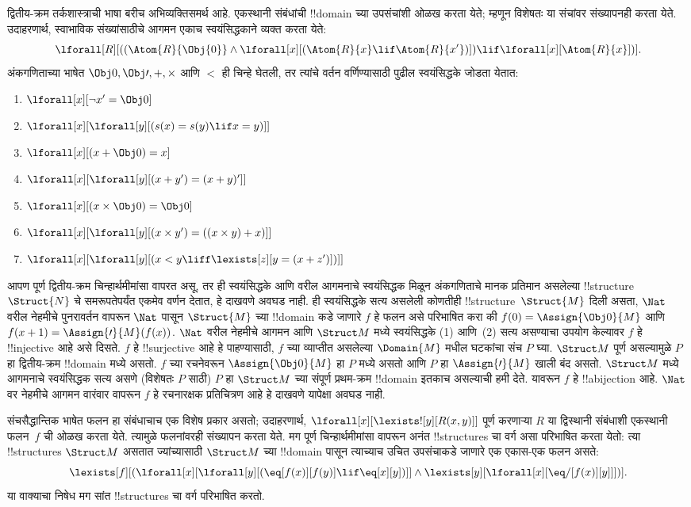 \documentclass[../../../include/open-logic-section]{subfiles}
\begin{document}
द्वितीय-क्रम तर्कशास्त्राची भाषा बरीच अभिव्यक्तिसमर्थ आहे. एकस्थानी संबंधांची
!!{domain} च्या उपसंचांशी ओळख करता येते; म्हणून विशेषतः या संचांवर संख्यापनही
करता येते. उदाहरणार्थ, स्वाभाविक संख्यांसाठीचे आगमन एकाच स्वयंसिद्धकाने
व्यक्त करता येते:
\[
\lforall[R][((\Atom{R}{\Obj{0}} \land \lforall[x][(\Atom{R}{x} \lif
    \Atom{R}{x'})]) \lif \lforall[x][\Atom{R}{x}])].
\]
अंकगणिताच्या भाषेत $\Obj 0, \Obj \prime, +, \times$ आणि $<$ ही चिन्हे घेतली,
तर त्यांचे वर्तन वर्णिण्यासाठी पुढील स्वयंसिद्धके जोडता येतात:
\begin{enumerate}
\item $\lforall[x][\lnot x' = \Obj 0]$
\item $\lforall[x][\lforall[y][(s(x) = s(y) \lif x = y)]]$
\item $\lforall[x][(x + \Obj 0) = x]$
\item $\lforall[x][\lforall[y][(x + y') = (x + y)']]$
\item $\lforall[x][(x \times \Obj 0) = \Obj 0]$
\item $\lforall[x][\lforall[y][(x \times y') = ((x \times y) + x)]]$
\item $\lforall[x][\lforall[y][(x < y \liff \lexists[z][y = (x + z')])]]$
\end{enumerate}
आपण पूर्ण द्वितीय-क्रम चिन्हार्थमीमांसा वापरत असू, तर ही स्वयंसिद्धके आणि
वरील आगमनाचे स्वयंसिद्धक मिळून अंकगणिताचे मानक प्रतिमान असलेल्या
!!{structure}~$\Struct{N}$ चे समरूपतेपर्यंत एकमेव वर्णन देतात, हे दाखवणे
अवघड नाही. ही स्वयंसिद्धके सत्य असलेली कोणतीही !!{structure}~$\Struct{M}$
दिली असता, $\Nat$ वरील नेहमीचे पुनरावर्तन वापरून $\Nat$ पासून
$\Struct{M}$ च्या !!{domain} कडे जाणारे $f$ हे फलन असे परिभाषित करा की
$f(0) = \Assign{\Obj 0}{M}$ आणि $f(x+1) = \Assign{\prime}{M}(f(x))$.
$\Nat$ वरील नेहमीचे आगमन आणि $\Struct M$ मध्ये स्वयंसिद्धके (1) आणि~(2)
सत्य असण्याचा उपयोग केल्यावर $f$ हे !!{injective} आहे असे दिसते. $f$ हे
!!{surjective} आहे हे पाहण्यासाठी, $f$ च्या व्याप्तीत असलेल्या
$\Domain{M}$ मधील घटकांचा संच $P$ घ्या. $\Struct M$ पूर्ण असल्यामुळे $P$
हा द्वितीय-क्रम !!{domain} मध्ये असतो. $f$ च्या रचनेवरून
$\Assign{\Obj 0}{M}$ हा $P$ मध्ये असतो आणि $P$ हा
$\Assign{\prime}{M}$ खाली बंद असतो. $\Struct M$ मध्ये आगमनाचे स्वयंसिद्धक
सत्य असणे (विशेषतः $P$ साठी) $P$ हा $\Struct M$ च्या संपूर्ण प्रथम-क्रम
!!{domain} इतकाच असल्याची हमी देते. यावरून $f$ हे !!a{bijection} आहे.
$\Nat$ वर नेहमीचे आगमन वारंवार वापरून $f$ हे रचनारक्षक प्रतिचित्रण आहे हे
दाखवणे यापेक्षा अवघड नाही.

संचसैद्धान्तिक भाषेत फलन हा संबंधाचाच एक विशेष प्रकार असतो; उदाहरणार्थ,
$\lforall[x][\lexists![y][R(x,y)]]$ पूर्ण करणाऱ्या $R$ या द्विस्थानी
संबंधाशी एकस्थानी फलन~$f$ ची ओळख करता येते. त्यामुळे फलनांवरही संख्यापन करता
येते. मग पूर्ण चिन्हार्थमीमांसा वापरून अनंत !!{structure}s चा वर्ग असा
परिभाषित करता येतो: त्या !!{structure}s $\Struct M$ असतात ज्यांच्यासाठी
$\Struct M$ च्या !!{domain} पासून त्याच्याच उचित उपसंचाकडे जाणारे एक
एकास-एक फलन असते:
\[
\lexists[f][(\lforall[x][\lforall[y][(\eq[f(x)][f(y)] \lif \eq[x][y])]]
  \land \lexists[y][\lforall[x][\eq/[f(x)][y]]])].
\]
या वाक्याचा निषेध मग सांत !!{structure}s चा वर्ग परिभाषित करतो.
\end{document}
